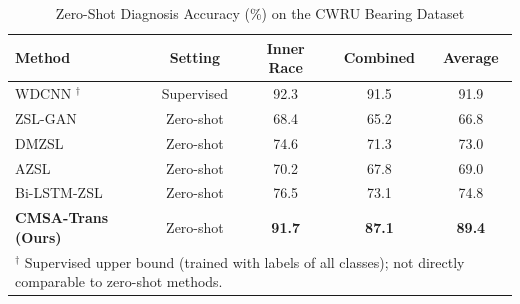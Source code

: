 \begin{table}[htbp]
\centering
\caption{Zero-Shot Diagnosis Accuracy (\%) on the CWRU Bearing Dataset}
\label{tab:cwru_results}
\begin{tabular}{lcccc}
\toprule
\textbf{Method} & \textbf{Setting} & \textbf{Inner Race} & \textbf{Combined} & \textbf{Average} \\
\midrule
WDCNN \cite{zhang2017new}$^\dagger$ & Supervised & 92.3 & 91.5 & 91.9 \\
\midrule
ZSL-GAN \cite{xian2019fvaegan} & Zero-shot & 68.4 & 65.2 & 66.8 \\
DMZSL \cite{schonfeld2019generalized} & Zero-shot & 74.6 & 71.3 & 73.0 \\
AZSL \cite{lampert2014attribute} & Zero-shot & 70.2 & 67.8 & 69.0 \\
Bi-LSTM-ZSL \cite{chen2019bearing} & Zero-shot & 76.5 & 73.1 & 74.8 \\
\textbf{CMSA-Trans (Ours)} & Zero-shot & \textbf{91.7} & \textbf{87.1} & \textbf{89.4} \\
\bottomrule
\multicolumn{5}{l}{\footnotesize $^\dagger$ Supervised upper bound (trained with labels of all classes); not directly comparable to zero-shot methods.}
\end{tabular}
\end{table}

